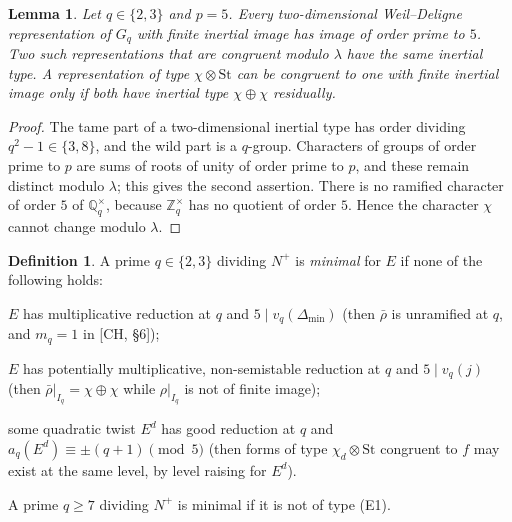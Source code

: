 \documentclass[11pt]{amsart}
\newtheorem{lemma}[theorem]{Lemma}
\theoremstyle{definition}
\newtheorem{definition}[theorem]{Definition}
\theoremstyle{remark}
\newcommand{\Q}{\mathbb{Q}}
\newcommand{\Z}{\mathbb{Z}}
\newcommand{\St}{\mathrm{St}}
\begin{document}
\begin{lemma}\label{lem:types23}
Let $q\in\{2,3\}$ and $p=5$. Every two-dimensional Weil--Deligne representation of $G_q$ with finite inertial image has image of order prime to $5$. Two such representations that are congruent modulo $\lambda$ have the same inertial type. A representation of type $\chi\otimes\St$ can be congruent to one with finite inertial image only if both have inertial type $\chi\oplus\chi$ residually.
\end{lemma}
\begin{proof}
The tame part of a two-dimensional inertial type has order dividing $q^2-1\in\{3,8\}$, and the wild part is a $q$-group. Characters of groups of order prime to $p$ are sums of roots of unity of order prime to $p$, and these remain distinct modulo $\lambda$; this gives the second assertion. There is no ramified character of order $5$ of $\Q_q^\times$, because $\Z_q^\times$ has no quotient of order $5$. Hence the character $\chi$ cannot change modulo $\lambda$.
\end{proof}

\begin{definition}\label{def:min}
A prime $q\in\{2,3\}$ dividing $N^+$ is \emph{minimal} for $E$ if none of the following holds:
\begin{description}[font=\normalfont]
\item[(E1)] $E$ has multiplicative reduction at $q$ and $5\mid v_q(\Delta_{\min})$ (then $\bar\rho$ is unramified at $q$, and $m_q=1$ in [CH, \S 6]);
\item[(E2)] $E$ has potentially multiplicative, non-semistable reduction at $q$ and $5\mid v_q(j)$ (then $\bar\rho|_{I_q}=\chi\oplus\chi$ while $\rho|_{I_q}$ is not of finite image);
\item[(E3)] some quadratic twist $E^d$ has good reduction at $q$ and $a_q(E^d)\equiv\pm(q+1)\pmod 5$ (then forms of type $\chi_d\otimes\St$ congruent to $f$ may exist at the same level, by level raising for $E^d$).
\end{description}
A prime $q\ge7$ dividing $N^+$ is minimal if it is not of type (E1).
\end{definition}
\end{document}
